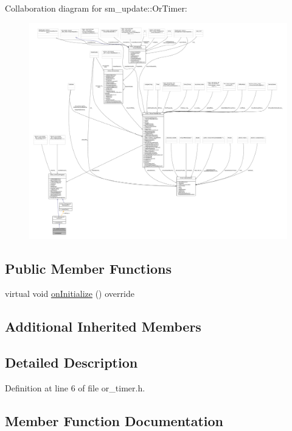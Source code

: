 Collaboration diagram for sm\+\_\+update\+:\+:Or\+Timer\+:
\nopagebreak
\begin{figure}[H]
\begin{center}
\leavevmode
\includegraphics[width=350pt]{classsm__update_1_1OrTimer__coll__graph}
\end{center}
\end{figure}
\subsection*{Public Member Functions}
\begin{DoxyCompactItemize}
\item 
virtual void \hyperlink{classsm__update_1_1OrTimer_a9525d08d04ae6eb84a0fe6c0c6310177}{on\+Initialize} () override
\end{DoxyCompactItemize}
\subsection*{Additional Inherited Members}


\subsection{Detailed Description}


Definition at line 6 of file or\+\_\+timer.\+h.



\subsection{Member Function Documentation}
